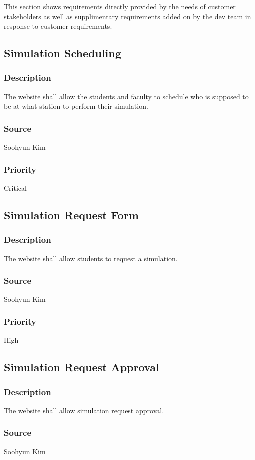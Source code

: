 This section shows requirements directly provided by the needs of customer stakeholders as well as supplimentary requirements added on by the dev team in response to customer requirements.

\subsection{Simulation Scheduling}
\subsubsection{Description}
The website shall allow the students and faculty to schedule who is supposed to be at what station to perform their simulation.
\subsubsection{Source}
Soohyun Kim
\subsubsection{Priority}
Critical

\subsection{Simulation Request Form}
\subsubsection{Description}
The website shall allow students to request a simulation.
\subsubsection{Source}
Soohyun Kim
\subsubsection{Priority}
High

\subsection{Simulation Request Approval}
\subsubsection{Description}
The website shall allow simulation request approval.
\subsubsection{Source}
Soohyun Kim
